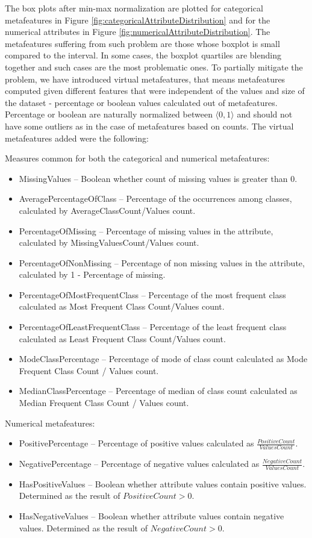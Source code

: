 The box plots after min-max normalization are plotted for categorical metafeatures in Figure \ref{fig:categoricalAttributeDistribution} and  for the numerical attributes in Figure \ref{fig:numericalAttributeDistribution}.
The metafeatures suffering from such problem are those whose boxplot is small compared to the interval. In some cases, the boxplot quartiles are blending together and such cases are the most problematic ones. 
To partially mitigate the problem, we have introduced virtual metafeatures, that means metafeatures computed given different features that were independent of the values and size of the dataset - percentage or boolean values calculated out of metafeatures. Percentage or boolean are naturally normalized between $\langle 0,1 \rangle$ and should not have some outliers as in the case of metafeatures based on counts. The virtual metafeatures added were the following:

Measures common for both the categorical and numerical metafeatures:
\begin{itemize}
	\item MissingValues -- Boolean whether count of missing values is greater than 0.
	\item AveragePercentageOfClass -- Percentage of the occurrences among classes, calculated by AverageClassCount/Values count.
	\item PercentageOfMissing -- Percentage of missing values in the attribute, calculated by MissingValuesCount/Values count.
	\item PercentageOfNonMissing -- Percentage of non missing values in the attribute, calculated by 1 - Percentage of missing.
	\item PercentageOfMostFrequentClass -- Percentage of the most frequent class calculated as Most Frequent Class Count/Values count. 
	\item PercentageOfLeastFrequentClass -- Percentage of the least frequent class calculated as Least Frequent Class Count/Values count. 
	\item ModeClassPercentage -- Percentage of mode of class count calculated as Mode Frequent Class Count / Values count.
	\item MedianClassPercentage -- Percentage of median of class count calculated as Median Frequent Class Count / Values count.	
\end{itemize}

Numerical metafeatures:
\begin{itemize}
	\item PositivePercentage -- Percentage of positive values calculated as $\frac{PositiveCount}{ValuesCount}$.
	\item NegativePercentage -- Percentage of negative values calculated as $\frac{NegativeCount}{ValuesCount}$.  
	\item HasPositiveValues -- Boolean whether attribute values contain positive values. Determined as the result of $PositiveCount > 0$.
	\item HasNegativeValues -- Boolean whether attribute values contain negative values. Determined as the result of $NegativeCount > 0$.
\end{itemize}


